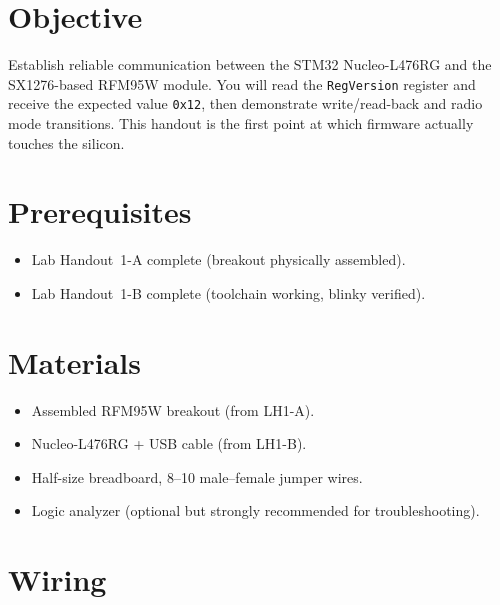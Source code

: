 \documentclass[11pt,letterpaper]{article}
\begin{document}

\section{Objective}
Establish reliable \SPI{} communication between the STM32 Nucleo-L476RG and the SX1276-based RFM95W module. You will read the \texttt{RegVersion} register and receive the expected value \texttt{0x12}, then demonstrate write/read-back and radio mode transitions. This handout is the first point at which firmware actually touches the \RF{} silicon.

\section{Prerequisites}
\begin{itemize}[leftmargin=2em]
	\item Lab Handout~1-A complete (breakout physically assembled).
	\item Lab Handout~1-B complete (toolchain working, blinky verified).
\end{itemize}

\section{Materials}
\begin{itemize}[leftmargin=2em]
	\item Assembled RFM95W breakout (from LH1-A).
	\item Nucleo-L476RG + USB cable (from LH1-B).
	\item Half-size breadboard, 8--10 male--female jumper wires.
	\item Logic analyzer (optional but strongly recommended for troubleshooting).
\end{itemize}

\newpage
\section{Wiring}
\end{document}

